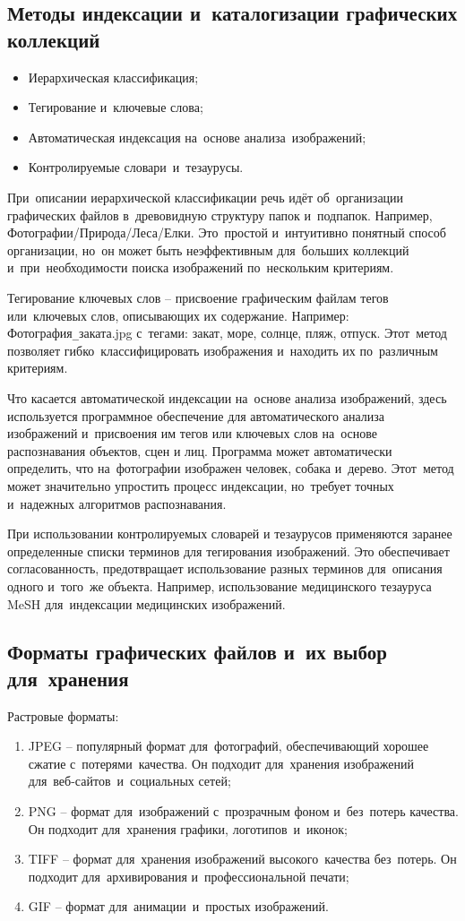 \documentclass{ou}
\begin{document}
\subsection{Методы индексации и~каталогизации графических коллекций}
\begin{itemize}[label=-, itemindent=2em, nosep]
\item Иерархическая классификация;
\item Тегирование и~ключевые слова;
\item Автоматическая индексация на~основе анализа~изображений;
\item Контролируемые словари~и~тезаурусы.
\end{itemize}

При~описании иерархической классификации речь идёт об~организации графических файлов в~древовидную структуру папок и~подпапок. Например, Фотографии/Природа/Леса/Елки. Это~простой и~интуитивно понятный способ организации, но~он может быть неэффективным для~больших коллекций и~при~необходимости поиска изображений по~нескольким критериям.

Тегирование ключевых слов -- присвоение графическим файлам тегов или~ключевых слов, описывающих их содержание. Например: Фотография\verb|_|заката.jpg с~тегами: закат, море, солнце, пляж, отпуск. Этот~метод позволяет гибко~классифицировать изображения и~находить их по~различным критериям.

Что касается автоматической индексации на~основе анализа изображений, здесь используется программное обеспечение для автоматического анализа изображений и~присвоения им тегов или ключевых слов на~основе распознавания объектов, сцен и лиц. Программа может автоматически определить, что на~фотографии изображен человек, собака и~дерево. Этот~метод может значительно упростить процесс индексации, но~требует точных и~надежных алгоритмов распознавания.

При использовании контролируемых словарей и тезаурусов применяются заранее определенные списки терминов для тегирования изображений. Это обеспечивает согласованность, предотвращает использование разных терминов для~описания одного и~того~же объекта. Например, использование медицинского тезауруса MeSH для~индексации медицинских изображений.
\subsection{Форматы графических файлов и~их выбор для~хранения}
Растровые форматы:
\begin{enumerate}[itemindent=2em, nosep, label=\arabic*)]
\item JPEG -- популярный формат для~фотографий, обеспечивающий хорошее сжатие с~потерями~качества. Он подходит для~хранения изображений для~веб-сайтов~и~социальных сетей;
\item PNG -- формат для~изображений с~прозрачным фоном и~без~потерь качества. Он подходит для~хранения графики, логотипов~и~иконок;
\item TIFF -- формат для~хранения изображений высокого~качества без~потерь. Он подходит для~архивирования и~профессиональной печати;
\item GIF -- формат для~анимации~и~простых изображений.
\end{enumerate}
\end{document}
